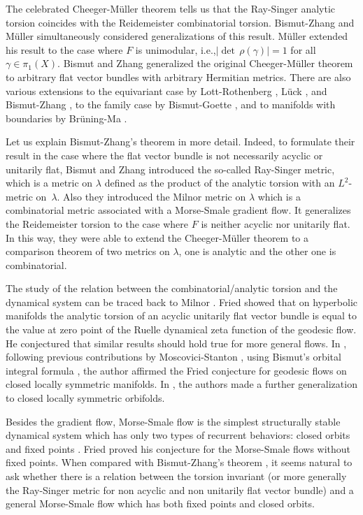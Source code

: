 \documentclass[11pt]{article}
\newcommand{\ie}{i.e.,\xspace}
\numberwithin{equation}{section}
\theoremstyle{plain}
\theoremstyle{definition}
\theoremstyle{remark}
\begin{document}
The celebrated Cheeger-Müller theorem
\cite{Ch79,Muller78} tells us that the Ray-Singer analytic torsion
coincides with the Reidemeister combinatorial torsion. Bismut-Zhang \cite{BZ92} and Müller \cite{Muller2} simultaneously
considered generalizations of this result.
Müller \cite{Muller2} extended his result to the case where $F$ is
unimodular, \ie $|{\det\,}
\rho(\gamma)|=1$ for all $\gamma\in \pi_{1}(X)$. Bismut and Zhang \cite[Th.\,0.2]{BZ92} generalized the original Cheeger-Müller
theorem to arbitrary flat vector bundles with arbitrary Hermitian
metrics.
There are also various extensions to the
equivariant case by Lott-Rothenberg \cite{LottRothengerg}, Lück \cite{LuckTorsion}, and Bismut-Zhang \cite{BZ94}, to the family case by
Bismut-Goette \cite{BG01}, and to
manifolds with boundaries by Brüning-Ma \cite{BruningMa_2012}.

Let us explain Bismut-Zhang's theorem \cite[Th.\,0.2]{BZ92} in more detail. Indeed, to
formulate their result in the case where the flat vector bundle is not
necessarily acyclic or unitarily flat, Bismut and Zhang introduced the so-called Ray-Singer metric, which is a
metric on $\lambda$ defined as the product of
the analytic torsion with an $L^2$-metric on~$\lambda$.
Also they introduced the Milnor metric on $\lambda$ which is a combinatorial
metric associated with a Morse-Smale gradient flow. It generalizes the
Reidemeister torsion to the case where $F$ is neither acyclic
nor unitarily flat. In this way,
they were able to extend the Cheeger-Müller theorem to a comparison theorem of two metrics on $\lambda$, one is analytic and the other
one is combinatorial.

The study of the relation between the combinatorial/analytic torsion and the dyna\-mical system
can be traced back to Milnor \cite{MilnorZcover}. Fried
\cite{FriedRealtorsion} showed that on hyperbolic manifolds the analytic torsion of an acyclic unitarily flat vector
bundle is equal to the value at zero point of the Ruelle dynamical zeta
function of the geodesic flow. He conjectured
\cite[p.\,66~Conj.]{Friedconj} that similar results should hold true for more general
flows. In \cite{Shfried}, following previous contributions
by
Moscovici-Stanton \cite{MStorsion}, using Bismut's orbital integral formula
\cite{B09}, the author affirmed the Fried
conjecture for geodesic flows on closed locally symmetric
manifolds. In \cite{Shen_Yu}, the authors made a further
generalization to closed locally symmetric orbifolds.

Besides the gradient flow, Morse-Smale flow is the simplest structurally stable dynamical system
which has only two types of recurrent behaviors: closed orbits and
fixed points \cite{Palis68,PalisSmale70}. Fried \cite[Th.\,3.1]{Friedconj}
proved his conjecture for the Morse-Smale flows without fixed points. When compared with Bismut-Zhang's theorem \cite[Th.\,0.2]{BZ92},
it seems natural to ask whether there is a relation between the torsion invariant (or more generally the
Ray-Singer metric for non acyclic and non unitarily flat vector bundle) and a general Morse-Smale flow which has both
fixed points and closed orbits.
\end{document}
